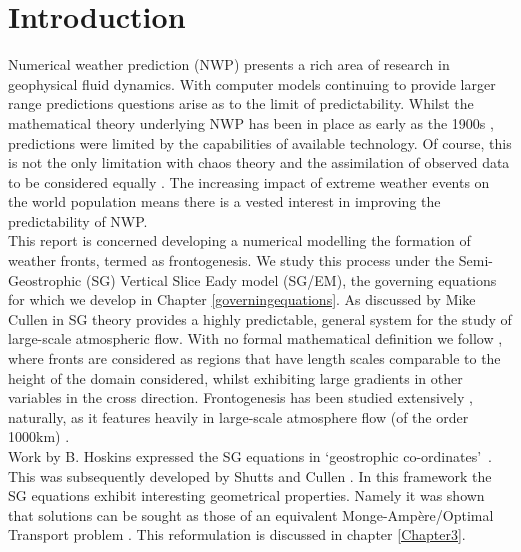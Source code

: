 \chapter*{Introduction}
Numerical weather prediction (NWP) presents a rich area of research in geophysical fluid dynamics. With computer models continuing to provide larger range predictions \cite{Cullen2006a} questions arise as to the limit of predictability. Whilst the mathematical theory underlying NWP has been in place as early as the 1900s \cite{Golding2004}, predictions were limited by the capabilities of available technology. Of course, this is not the only limitation with chaos theory and the assimilation of observed data to be considered equally \cite{Weisheimer}. The increasing impact of extreme weather events on the world population means there is a vested interest in improving the predictability of NWP.
\\
\linebreak
This report is concerned developing a numerical modelling the formation of weather fronts, termed as frontogenesis{\tiny }. We study this process under the Semi-Geostrophic (SG) Vertical Slice Eady model (SG/EM), the governing equations for which we develop in Chapter \ref{governingequations}. As discussed by Mike Cullen in \cite{Cullen2006a} SG theory provides a highly predictable, general system for the study of large-scale atmospheric flow. With no formal mathematical definition we follow \cite{Hoskins1982}, where fronts are considered as regions that have length scales comparable to the height of the domain considered, whilst exhibiting large gradients in other variables in the cross direction. Frontogenesis has been studied extensively \cite{Yamazaki2017, Cullen2008, Rotunno1994,Nakamura1988,Nakamura1994}, naturally, as it features heavily in large-scale atmosphere flow (of the order 1000km) \cite{Cullen2006a}.
\\
\linebreak
Work by B. Hoskins expressed the SG equations in \textquoteleft geostrophic co-ordinates\textquoteright \ \cite{Hoskins1972}. This was subsequently developed by Shutts and Cullen \cite{Shutts1987}. In this framework the SG equations exhibit interesting geometrical properties. Namely it was shown that solutions can be sought as those of an equivalent Monge-Amp\`{e}re/Optimal Transport problem \cite{Cullen2006a}. This reformulation is discussed in chapter \ref{Chapter3}.
\\
\linebreak
